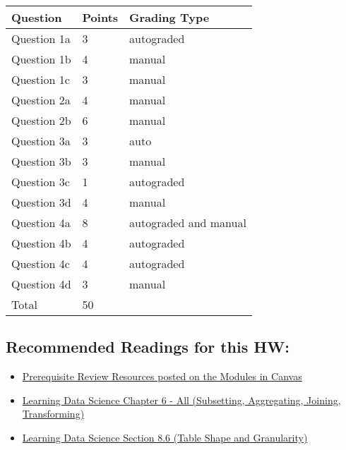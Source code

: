 \documentclass[11pt]{article}
\providecommand{\tightlist}{%
      \setlength{\itemsep}{0pt}\setlength{\parskip}{0pt}}
\begin{document}
\begin{longtable}[]{@{}lll@{}}
\toprule\noalign{}
Question & Points & Grading Type \\
\midrule\noalign{}
\endhead
\bottomrule\noalign{}
\endlastfoot
Question 1a & 3 & autograded \\
Question 1b & 4 & manual \\
Question 1c & 3 & manual \\
Question 2a & 4 & manual \\
Question 2b & 6 & manual \\
Question 3a & 3 & auto \\
Question 3b & 3 & manual \\
Question 3c & 1 & autograded \\
Question 3d & 4 & manual \\
Question 4a & 8 & autograded and manual \\
Question 4b & 4 & autograded \\
Question 4c & 4 & autograded \\
Question 4d & 3 & manual \\
Total & 50 & \\
\end{longtable}

    \subsection{Recommended Readings for this
HW:}\label{recommended-readings-for-this-hw}

\begin{itemize}
\tightlist
\item
  \href{https://canvas.colorado.edu/courses/101142/pages/prerequisite-review-calculus-and-discrete-structures?module_item_id=5144193}{Prerequisite
  Review Resources posted on the Modules in Canvas}
\item
  \href{https://learningds.org/ch/06/pandas_intro.html}{Learning Data
  Science Chapter 6 - All (Subsetting, Aggregating, Joining,
  Transforming)}
\item
  \href{https://learningds.org/ch/08/files_granularity.html\#table-shape-and-granularity}{Learning
  Data Science Section 8.6 (Table Shape and Granularity)}
\end{itemize}

    \subsection{}\label{section}
\end{document}
